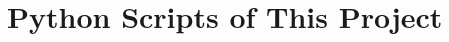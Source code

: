 \documentclass[../g5_final_report.tex]{subfiles}
\begin{document}
\chapter{Python Scripts of This Project}
\end{document}
